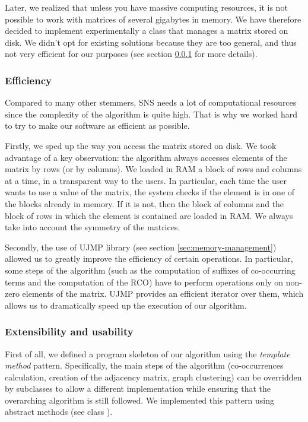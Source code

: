             Later, we realized that unless you have massive computing resources, it is not possible to work with matrices of several gigabytes in memory. We have therefore decided to implement experimentally a class that manages a matrix stored on disk. We didn't opt for existing solutions because they are too general, and thus not very efficient for our purposes (see section \ref{sec:efficiency} for more details).

        \subsubsection{Efficiency}\label{sec:efficiency}

            Compared to many other stemmers, SNS needs a lot of computational resources since the complexity of the algorithm is quite high. That is why we worked hard to try to make our software as efficient as possible.
            
            Firstly, we sped up the way you access the matrix stored on disk. We took advantage of a key observation: the algorithm always accesses elements of the matrix by rows (or by columns). We loaded in RAM a block of rows and columns at a time, in a transparent way to the users. In particular, each time the user wants to use a value of the matrix, the system checks if the element is in one of the blocks already in memory. If it is not, then the block of columns and the block of rows in which the element is contained are loaded in RAM. We always take into account the symmetry of the matrices.

            Secondly, the use of UJMP library (see section \ref{sec:memory-management}) allowed us to greatly improve the efficiency of certain operations. In particular, some steps of the algorithm (such as the computation of suffixes of co-occurring terms and the computation of the RCO) have to perform operations only on non-zero elements of the matrix. UJMP provides an efficient iterator over them, which allows us to dramatically speed up the execution of our algorithm.

        \subsubsection{Extensibility and usability}
            First of all, we defined a program skeleton of our algorithm using the \emph{template method} pattern. Specifically, the main steps of the algorithm (co-occurrences calculation, creation of the adjacency matrix, graph clustering) can be overridden by subclasses to allow a different implementation while ensuring that the overarching algorithm is still followed. We implemented this pattern using abstract methods (see class ).

